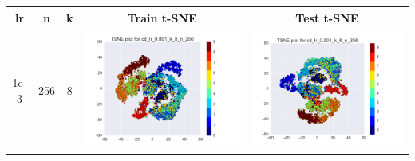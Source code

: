 \documentclass[12pt]{report}
\begin{document}
\begin{table}[H]
  \centering
  \begin{tabular}{ | c | c | c | c || c |}
    \hline
    \textbf{lr} & \textbf{n} & \textbf{k} & \textbf{Train t-SNE} & \textbf{Test t-SNE}\\ \hline
    1e-3 & 256 & 8 &
    \begin{minipage}{.3\textwidth}
      \includegraphics[scale=0.25]{cd_lr_0_001_k_8_n_256.png}
    \end{minipage} &
    \begin{minipage}{.3\textwidth}
      \includegraphics[scale=0.25]{test_cd_lr_0_001_k_8_n_256.png}
    \end{minipage}

\end{tabular}
\end{table}
\end{document}
